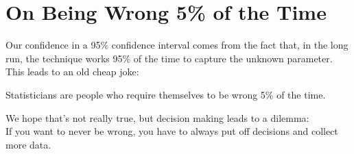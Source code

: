 \def\theTopic{Errors }
\def\dayNum{16 }

\section{ On Being Wrong 5\% of the Time}


Our confidence in a 95\% confidence interval comes from the fact that,
in the long run, the technique works 95\% of the time to capture the
unknown parameter.  This leads to an old cheap joke:

{\sf Statisticians are people who require themselves to be wrong 5\%
  of the time.}

We hope that's not really true, but decision making leads to a dilemma:\\
  If you want to never be wrong, you have to always put off decisions
  and collect more data.

